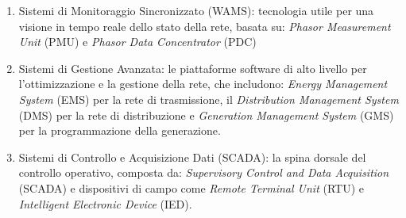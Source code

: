     

\begin{enumerate}
    \item Sistemi di Monitoraggio Sincronizzato (WAMS): tecnologia utile per una visione in tempo reale dello stato della rete, basata su: \textit{Phasor Measurement Unit} (PMU) e \textit{Phasor Data Concentrator} (PDC)
    
    \item Sistemi di Gestione Avanzata: le piattaforme software di alto livello per l'ottimizzazione e la gestione della rete, che includono:
    \textit{Energy Management System} (EMS) per la rete di trasmissione,  il \textit{Distribution Management System} (DMS) per la rete di distribuzione e \textit{Generation Management System} (GMS) per la programmazione della generazione.
    
    \item Sistemi di Controllo e Acquisizione Dati (SCADA): la spina dorsale del controllo operativo, composta da: \textit{Supervisory Control and Data Acquisition} (SCADA) e dispositivi di campo come \textit{Remote Terminal Unit} (RTU) e \textit{Intelligent Electronic Device} (IED).
\end{enumerate}


